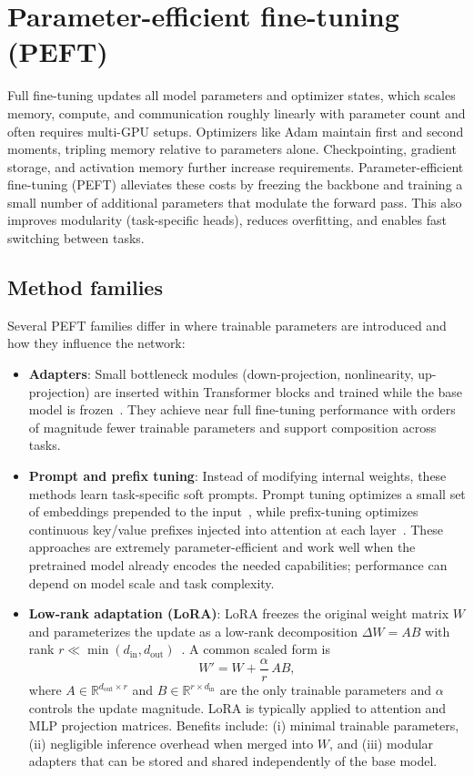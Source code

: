 \section{Parameter-efficient fine-tuning (PEFT)}
Full fine-tuning updates all model parameters and optimizer states, which scales memory, compute, and communication roughly linearly with parameter count and often requires multi-GPU setups. Optimizers like Adam maintain first and second moments, tripling memory relative to parameters alone. Checkpointing, gradient storage, and activation memory further increase requirements. Parameter-efficient fine-tuning (PEFT) alleviates these costs by freezing the backbone and training a small number of additional parameters that modulate the forward pass. This also improves modularity (task-specific heads), reduces overfitting, and enables fast switching between tasks.

\subsection{Method families}
Several PEFT families differ in where trainable parameters are introduced and how they influence the network:
\begin{itemize}
    \item \textbf{Adapters}: Small bottleneck modules (down-projection, nonlinearity, up-projection) are inserted within Transformer blocks and trained while the base model is frozen~\cite{houlsby2019parameter}. They achieve near full fine-tuning performance with orders of magnitude fewer trainable parameters and support composition across tasks.
    \item \textbf{Prompt and prefix tuning}: Instead of modifying internal weights, these methods learn task-specific soft prompts. Prompt tuning optimizes a small set of embeddings prepended to the input~\cite{lester2021power}, while prefix-tuning optimizes continuous key/value prefixes injected into attention at each layer~\cite{li2021prefixtuning}. These approaches are extremely parameter-efficient and work well when the pretrained model already encodes the needed capabilities; performance can depend on model scale and task complexity.
    \item \textbf{Low-rank adaptation (LoRA)}: LoRA freezes the original weight matrix $W$ and parameterizes the update as a low-rank decomposition $\Delta W = A B$ with rank $r \ll \min(d_{\text{in}}, d_{\text{out}})$~\cite{hu2021loralowrankadaptationlarge}. A common scaled form is
    \begin{equation*}
    W' = W + \frac{\alpha}{r}\, A B,
    \end{equation*}
    where $A \in \mathbb{R}^{d_{\text{out}} \times r}$ and $B \in \mathbb{R}^{r \times d_{\text{in}}}$ are the only trainable parameters and $\alpha$ controls the update magnitude. LoRA is typically applied to attention and MLP projection matrices. Benefits include: (i) minimal trainable parameters, (ii) negligible inference overhead when merged into $W$, and (iii) modular adapters that can be stored and shared independently of the base model.
\end{itemize}


